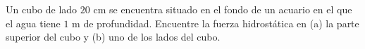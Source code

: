 \item Un cubo de lado $20 \text{ cm}$ se encuentra situado en el fondo de un acuario en el que el agua tiene $1 \text{ m}$ de profundidad. Encuentre la fuerza hidrostática en (a) la parte superior del cubo y (b) uno de los lados del cubo.
